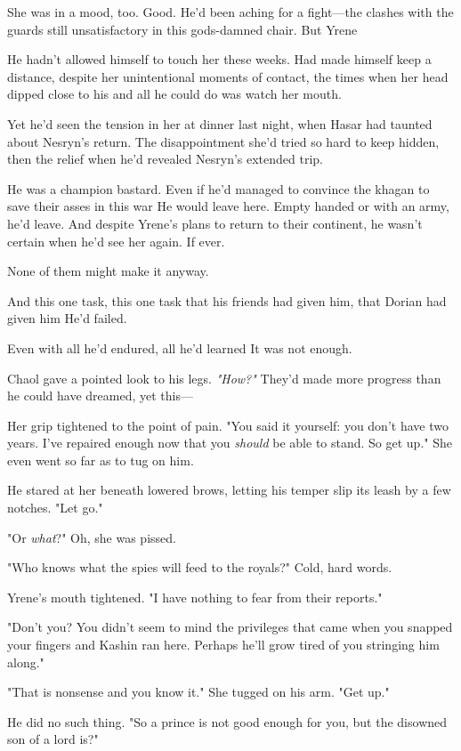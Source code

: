 She was in a mood, too. Good. He'd been aching for a fight---the clashes with the guards still unsatisfactory in this gods-damned chair. But Yrene 

He hadn't allowed himself to touch her these weeks. Had made himself keep a distance, despite her unintentional moments of contact, the times when her head dipped close to his and all he could do was watch her mouth.

Yet he'd seen the tension in her at dinner last night, when Hasar had taunted about Nesryn's return. The disappointment she'd tried so hard to keep hidden, then the relief when he'd revealed Nesryn's extended trip.

He was a champion bastard. Even if he'd managed to convince the khagan to save their asses in this war  He would leave here. Empty handed or with an army, he'd leave. And despite Yrene's plans to return to their continent, he wasn't certain when he'd see her again. If ever.

None of them might make it anyway.

And this one task, this one task that his friends had given him, that Dorian had given him  He'd failed.

Even with all he'd endured, all he'd learned  It was not enough.

Chaol gave a pointed look to his legs. \emph{"How?"} They'd made more progress than he could have dreamed, yet this---

Her grip tightened to the point of pain. "You said it yourself: you don't have two years. I've repaired enough now that you \emph{should} be able to stand. So get up." She even went so far as to tug on him.

He stared at her beneath lowered brows, letting his temper slip its leash by a few notches. "Let go."

"Or \emph{what}?" Oh, she was pissed.

"Who knows what the spies will feed to the royals?" Cold, hard words.

Yrene's mouth tightened. "I have nothing to fear from their reports."

"Don't you? You didn't seem to mind the privileges that came when you snapped your fingers and Kashin ran here. Perhaps he'll grow tired of you stringing him along."

"That is nonsense and you know it." She tugged on his arm. "Get up."

He did no such thing. "So a prince is not good enough for you, but the disowned son of a lord is?"

